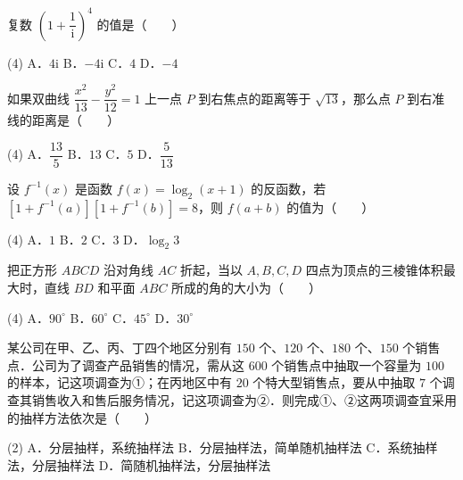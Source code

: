 

\begin{question}
复数 $\left(1 + \dfrac{1}{\mathrm{i}}\right)^4$ 的值是\mbox{（　　）}

\begin{gkopts}(4)
\task A．$4\mathrm{i}$
\task B．$-4\mathrm{i}$
\task C．$4$
\task D．$-4$
\end{gkopts}

\end{question}
\begin{question}
如果双曲线 $\dfrac{x^2}{13} - \dfrac{y^2}{12} = 1$ 上一点 $P$ 到右焦点的距离等于 $\sqrt{13}$，那么点 $P$ 到右准线的距离是\mbox{（　　）}

\begin{gkopts}(4)
\task A．$\dfrac{13}{5}$
\task B．$13$
\task C．$5$
\task D．$\dfrac{5}{13}$
\end{gkopts}

\end{question}
\begin{question}
设 $f^{-1}(x)$ 是函数 $f(x) = \log_2(x + 1)$ 的反函数，若 $[1 + f^{-1}(a)][1 + f^{-1}(b)] = 8$，则 $f(a + b)$ 的值为\mbox{（　　）}

\begin{gkopts}(4)
\task A．$1$
\task B．$2$
\task C．$3$
\task D．$\log_2 3$
\end{gkopts}

\end{question}
\begin{question}
把正方形 $ABCD$ 沿对角线 $AC$ 折起，当以 $A, B, C, D$ 四点为顶点的三棱锥体积最大时，直线 $BD$ 和平面 $ABC$ 所成的角的大小为\mbox{（　　）}

\begin{gkopts}(4)
\task A．$90^\circ$
\task B．$60^\circ$
\task C．$45^\circ$
\task D．$30^\circ$
\end{gkopts}

\end{question}
\begin{question}
某公司在甲、乙、丙、丁四个地区分别有 $150$ 个、$120$ 个、$180$ 个、$150$ 个销售点．公司为了调查产品销售的情况，需从这 $600$ 个销售点中抽取一个容量为 $100$ 的样本，记这项调查为①；在丙地区中有 $20$ 个特大型销售点，要从中抽取 $7$ 个调查其销售收入和售后服务情况，记这项调查为②．则完成①、②这两项调查宜采用的抽样方法依次是\mbox{（　　）}

\begin{gkopts}(2)
\task A．分层抽样，系统抽样法
\task B．分层抽样法，简单随机抽样法
\task C．系统抽样法，分层抽样法
\task D．简随机抽样法，分层抽样法
\end{gkopts}

\end{question}

